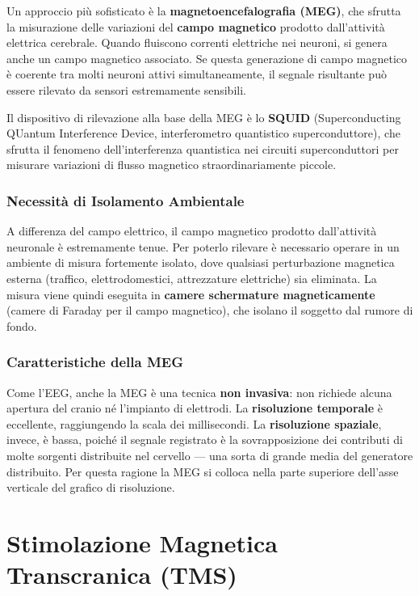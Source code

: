 Un approccio più sofisticato è la \textbf{magnetoencefalografia (MEG)}, che sfrutta la misurazione delle variazioni del \textbf{campo magnetico} prodotto dall'attività elettrica cerebrale. Quando fluiscono correnti elettriche nei neuroni, si genera anche un campo magnetico associato. Se questa generazione di campo magnetico è coerente tra molti neuroni attivi simultaneamente, il segnale risultante può essere rilevato da sensori estremamente sensibili.

Il dispositivo di rilevazione alla base della MEG è lo \textbf{SQUID} (Superconducting QUantum Interference Device, interferometro quantistico superconduttore), che sfrutta il fenomeno dell'interferenza quantistica nei circuiti superconduttori per misurare variazioni di flusso magnetico straordinariamente piccole. 

\subsubsection{Necessità di Isolamento Ambientale}

A differenza del campo elettrico, il campo magnetico prodotto dall'attività neuronale è estremamente tenue. Per poterlo rilevare è necessario operare in un ambiente di misura fortemente isolato, dove qualsiasi perturbazione magnetica esterna (traffico, elettrodomestici, attrezzature elettriche) sia eliminata. La misura viene quindi eseguita in \textbf{camere schermature magneticamente} (camere di Faraday per il campo magnetico), che isolano il soggetto dal rumore di fondo.

\subsubsection{Caratteristiche della MEG}

Come l'EEG, anche la MEG è una tecnica \textbf{non invasiva}: non richiede alcuna apertura del cranio né l'impianto di elettrodi. La \textbf{risoluzione temporale} è eccellente, raggiungendo la scala dei millisecondi. La \textbf{risoluzione spaziale}, invece, è bassa, poiché il segnale registrato è la sovrapposizione dei contributi di molte sorgenti distribuite nel cervello — una sorta di grande media del generatore distribuito. Per questa ragione la MEG si colloca nella parte superiore dell'asse verticale del grafico di risoluzione.

\section{Stimolazione Magnetica Transcranica (TMS)}


